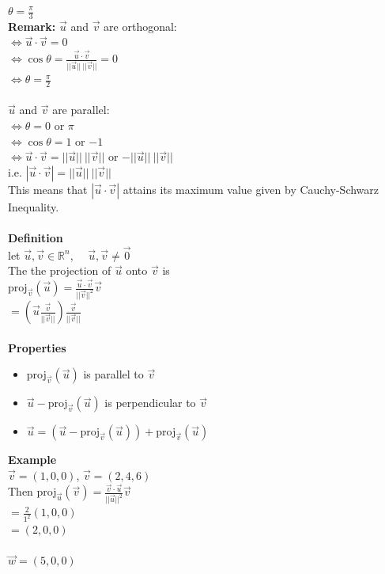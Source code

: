 \documentclass[]{article}
\begin{document}
		$\theta=\frac{\pi}{3}$\\
		{\bf Remark:} $\vec{u}$ and $\vec{v}$ are orthogonal:\\
		$\iff\vec{u}\cdot\vec{v}=0$\\
		$\iff\cos\theta=\frac{\vec{u}\cdot\vec{v}}{||\vec{u}||~||\vec{v}||}=0$\\
		$\iff\theta=\frac{\pi}{2}$\\\\
		$\vec{u}$ and $\vec{v}$ are parallel:\\
		$\iff\theta=0$ or $\pi$\\
		$\iff\cos\theta=1$ or $-1$\\
		$\iff\vec{u}\cdot\vec{v}=||\vec{u}||~||\vec{v}||$ or $-||\vec{u}||~||\vec{v}||$\\
		i.e. $|\vec{u}\cdot\vec{v}|=||\vec{u}||~||\vec{v}||$\\
		This means that $|\vec{u}\cdot\vec{v}|$ attains its maximum value given by Cauchy-Schwarz Inequality.\\\\
		{\bf Definition}\\
		let $\vec{u}, \vec{v}\in\mathbb{R}^n$, ~~$\vec{u},\vec{v}\ne\vec{0}$\\
		The the projection of $\vec{u}$ onto $\vec{v}$ is\\
		$\text{proj}_{\vec{v}}(\vec{u})=\frac{\vec{u}\cdot\vec{v}}{||\vec{v}||^2}\vec{v}$\\
		$=(\vec{u}\frac{\vec{v}}{||\vec{v}||})\frac{\vec{v}}{||\vec{v}||}$\\\\
		{\bf Properties}
		\begin{itemize}
			\item proj$_{\vec{v}}(\vec{u})$ is parallel to $\vec{v}$
			\item $\vec{u}-$proj$_{\vec{v}}(\vec{u})$ is perpendicular to $\vec{v}$
			\item $\vec{u}=(\vec{u}-\text{proj}_{\vec{v}}(\vec{u}))+$proj$_{\vec{v}}(\vec{u})$
		\end{itemize}
		{\bf Example}\\
		$\vec{v}=(1,0,0)$, $\vec{v}=(2,4,6)$\\
		Then proj$_{\vec{u}}(\vec{v})=\frac{\vec{v}\cdot\vec{u}}{||\vec{u}||^2}\vec{v}$\\
		$=\frac{2}{1^2}(1,0,0)$\\
		$=(2,0,0)$\\\\
		$\vec{w}=(5,0,0)$\\
\end{document}

